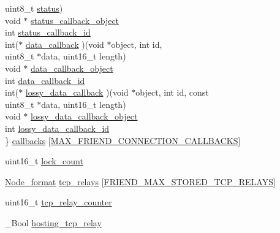 \begin{DoxyCompactItemize}
\begin{tabbing}
\>\>uint8\_t \hyperlink{struct_friend___conn_ade818037fd6c985038ff29656089758d}{status})\\
\>void $\ast$ \hyperlink{struct_friend___conn_a73f125475af5ebdac27d2c2a9060039b}{status\_callback\_object}\\
\>int \hyperlink{struct_friend___conn_a374df80da5cf3057d7c3743afadb2596}{status\_callback\_id}\\
\>int($\ast$ \hyperlink{struct_friend___conn_aeff54fdc061a263f5d331a9e0572fee7}{data\_callback} )(void $\ast$object, int id, \\
\>\>uint8\_t $\ast$data, uint16\_t length)\\
\>void $\ast$ \hyperlink{struct_friend___conn_a9135a1782241a1b2d5e9bcedef0c29a5}{data\_callback\_object}\\
\>int \hyperlink{struct_friend___conn_a51067e0002b1d9ac8e14377917289292}{data\_callback\_id}\\
\>int($\ast$ \hyperlink{struct_friend___conn_a12463710aaaa4801d03d6fe347d16e3e}{lossy\_data\_callback} )(void $\ast$object, int id, const \\
\>\>uint8\_t $\ast$data, uint16\_t length)\\
\>void $\ast$ \hyperlink{struct_friend___conn_a5a1c6eb314a3e3142dd5ae3d3868491b}{lossy\_data\_callback\_object}\\
\>int \hyperlink{struct_friend___conn_a5c67a04bbd12eda4d5fe29f10d082bec}{lossy\_data\_callback\_id}\\
\} \hyperlink{struct_friend___conn_a213983130190a8281ab689630f0aee97}{callbacks} \mbox{[}\hyperlink{friend__connection_8h_a28f384352cf0b5c144fdafb826701811}{MAX\_FRIEND\_CONNECTION\_CALLBACKS}\mbox{]}\\

\end{tabbing}\item 
uint16\+\_\+t \hyperlink{struct_friend___conn_a712c4c639bfc0f5a8616eead3e24ca4e}{lock\+\_\+count}
\item 
\hyperlink{struct_node__format}{Node\+\_\+format} \hyperlink{struct_friend___conn_ae6c286282d15bfd5ceea7c2d8b19be5d}{tcp\+\_\+relays} \mbox{[}\hyperlink{friend__connection_8h_aac882ca62f0b32b069ace03fa3f106c0}{F\+R\+I\+E\+N\+D\+\_\+\+M\+A\+X\+\_\+\+S\+T\+O\+R\+E\+D\+\_\+\+T\+C\+P\+\_\+\+R\+E\+L\+A\+Y\+S}\mbox{]}
\item 
uint16\+\_\+t \hyperlink{struct_friend___conn_aff5cc62447994133f0b5b15e11aa92ed}{tcp\+\_\+relay\+\_\+counter}
\item 
\+\_\+\+Bool \hyperlink{struct_friend___conn_a4865ba9009fdee84e62a08fb92a59ab5}{hosting\+\_\+tcp\+\_\+relay}
\end{DoxyCompactItemize}


